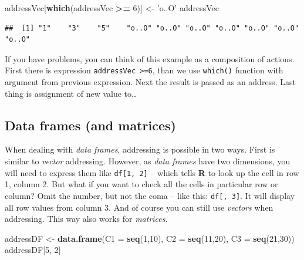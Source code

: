 \documentclass[]{book}
\newenvironment{Shaded}{\begin{snugshade}}{\end{snugshade}}
\newcommand{\KeywordTok}[1]{\textcolor[rgb]{0.13,0.29,0.53}{\textbf{#1}}}
\newcommand{\DataTypeTok}[1]{\textcolor[rgb]{0.13,0.29,0.53}{#1}}
\newcommand{\DecValTok}[1]{\textcolor[rgb]{0.00,0.00,0.81}{#1}}
\newcommand{\StringTok}[1]{\textcolor[rgb]{0.31,0.60,0.02}{#1}}
\newcommand{\OperatorTok}[1]{\textcolor[rgb]{0.81,0.36,0.00}{\textbf{#1}}}
\newcommand{\NormalTok}[1]{#1}
\theoremstyle{definition}
\theoremstyle{definition}
\theoremstyle{definition}
\theoremstyle{remark}
\begin{document}
\begin{Shaded}
\begin{Highlighting}[]
\NormalTok{addressVec[}\KeywordTok{which}\NormalTok{(addressVec }\OperatorTok{>=}\StringTok{ }\DecValTok{6}\NormalTok{)] <-}\StringTok{ 'o..O'}
\NormalTok{addressVec}
\end{Highlighting}
\end{Shaded}

\begin{verbatim}
##  [1] "1"    "3"    "5"    "o..O" "o..O" "o..O" "o..O" "o..O" "o..O" "o..O"
\end{verbatim}

If you have problems, you can think of this example as a composition of
actions. First there is expression
\texttt{addressVec\ \textgreater{}=6}, than we use \texttt{which()}
function with argument from previous expression. Next the result is
passed as an address. Last thing is assignment of new value to\ldots{}

\subsection{Data frames (and matrices)}\label{data-frames-and-matrices}

When dealing with \emph{data frames}, addressing is possible in two
ways. First is similar to \emph{vector} addressing. However, as
\emph{data frames} have two dimensions, you will need to express them
like \texttt{df{[}1,\ 2{]}} -- which tells \textbf{R} to look up the
cell in row 1, column 2. But what if you want to check all the cells in
particular row or column? Omit the number, but not the coma -- like
this: \texttt{df{[},\ 3{]}}. It will display all row values from column
3. And of course you can still use \emph{vectors} when addressing. This
way also works for \emph{matrices}.

\begin{Shaded}
\begin{Highlighting}[]
\NormalTok{addressDF <-}\StringTok{ }\KeywordTok{data.frame}\NormalTok{(}\DataTypeTok{C1 =} \KeywordTok{seq}\NormalTok{(}\DecValTok{1}\NormalTok{,}\DecValTok{10}\NormalTok{), }\DataTypeTok{C2 =} \KeywordTok{seq}\NormalTok{(}\DecValTok{11}\NormalTok{,}\DecValTok{20}\NormalTok{), }\DataTypeTok{C3 =} \KeywordTok{seq}\NormalTok{(}\DecValTok{21}\NormalTok{,}\DecValTok{30}\NormalTok{))}
\NormalTok{addressDF[}\DecValTok{5}\NormalTok{, }\DecValTok{2}\NormalTok{]}
\end{Highlighting}
\end{Shaded}
\end{document}
